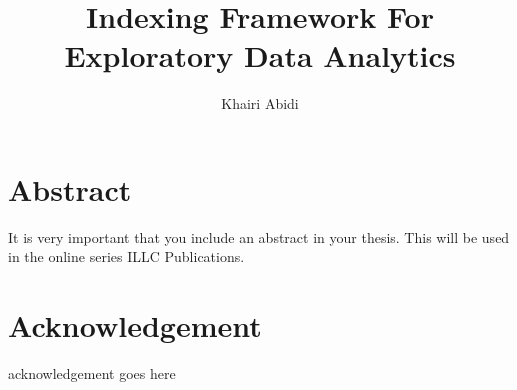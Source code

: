 \documentclass[titlepage]{report}
\begin{document}
\title{Indexing Framework For Exploratory Data Analytics}
\author{Khairi Abidi}
\maketitle

\tableofcontents

\chapter*{Abstract}
\begin{center}
    It is very important that you include an abstract in your thesis. This will be used in the online series ILLC Publications.
\end{center}

\chapter*{Acknowledgement}
\begin{center}
    acknowledgement goes here
\end{center}






\end{document}
